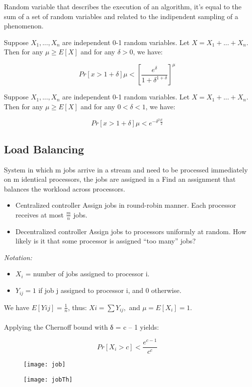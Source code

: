 Random variable that describes the execution of an algorithm, it's equal to the sum of a set of random variables and related to the indipendent sampling of a phenomenon.

\begin{claim}
    Suppose $X_{1}, ..., X_{n}$ are independent 0-1 random variables. Let $X = X_{1} + ... + X_{n}$. Then for any $μ \geq E[X]$ and for any $δ > 0$, we have:

    \[Pr[x>1+δ]μ <[\frac{e^{δ}}{1+δ^{1+δ}}]^{μ }\]
\end{claim}

\begin{claim}
    Suppose $X_{1}, ..., X_{n}$ are independent 0-1 random variables. Let $X = X_{1} + ... + X_{n}$. Then for any $μ \geq E[X]$ and for any $0<δ<1$, we have:

    \[Pr[x>1+δ]μ <e^{-δ^{2}\frac{μ}{2}}\]
\end{claim}


\subsection{Load Balancing}
System in which m jobs arrive in a stream and need to be processed immediately on m identical processors, the jobs are assigned in a  Find an assignment that balances the workload across processors.

\begin{itemize}
    \item{Centralized controller}
          Assign jobs in round-robin manner. Each processor receives at most $\frac{m}{n}$ jobs.
    \item{Decentralized controller}
          Assign jobs to processors uniformly at random. How likely is it that some processor is assigned “too many” jobs?

\end{itemize}

\emph{Notation:}

\begin{itemize}
    \item{$X_{i}$ = number of jobs assigned to processor i.}
    \item{$Y_{ij} = 1$ if job j assigned to processor i, and 0 otherwise.}
\end{itemize}

We have $E[Yij] = \frac{1}{n}$, thus: $Xi = \sum Y_{ij}  ,$ and $μ = E[X_{i}] = 1$.\\\\
Applying the Chernoff bound  with δ = c – 1 yields:

\[ Pr[X_{i} > c] < \frac{e^{c-1}}{c^{c}}\]

\begin{figure}[H]
    \centering
    \texttt{[image: job]}
\end{figure}

\begin{figure}[H]
    \centering
    \texttt{[image: jobTh]}
\end{figure}

\clearpage
